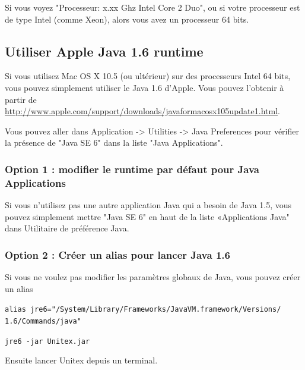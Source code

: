 \bigskip
\noindent Si vous voyez "Processeur: x.xx Ghz Intel Core 2 Duo", ou si votre
processeur est de type Intel (comme Xeon), alors vous avez un processeur 64 bits.

\subsection{Utiliser Apple Java 1.6 runtime}
\bigskip{}
\noindent Si vous utilisez Mac OS X 10.5 (ou ultérieur) sur des processeurs Intel 64 bits, vous pouvez simplement utiliser le Java 1.6 d'Apple. Vous pouvez l'obtenir à partir de \url{http://www.apple.com/support/downloads/javaformacosx105update1.html}.

\noindent Vous pouvez aller dans Application -> Utilities -> Java Preferences pour vérifier la présence  de "Java SE 6" dans la liste "Java Applications".


\subsubsection{Option 1 : modifier le runtime par défaut pour Java Applications}
\noindent Si vous n'utilisez pas une autre application Java qui a besoin de Java 1.5, vous pouvez
simplement mettre "Java SE 6" en haut de la liste «Applications Java" dans Utilitaire de préférence
Java.
\subsubsection{Option 2 : Créer un alias pour lancer Java 1.6}
\noindent Si vous ne voulez pas modifier les paramètres globaux de Java, vous pouvez créer un alias

\bigskip
\noindent \verb+alias jre6="/System/Library/Frameworks/JavaVM.framework/Versions/+
\noindent \verb+1.6/Commands/java"+
   
\bigskip
\noindent \verb+jre6 -jar Unitex.jar+

\bigskip
\noindent Ensuite lancer Unitex depuis un terminal.




